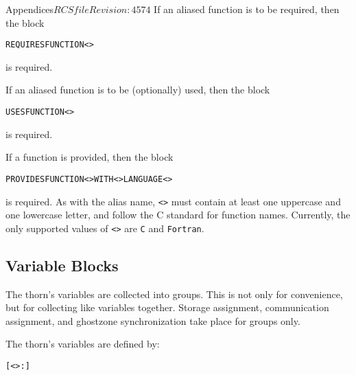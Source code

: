 \begin{cactuspart}{Appendices}{$RCSfile$}{$Revision: 4574 $}
If an aliased function is to be required, then the block
\begin{alltt}
REQUIRES FUNCTION <>
\end{alltt}
is required.

If an aliased function is to be (optionally) used, then the block
\begin{alltt}
USES FUNCTION <>
\end{alltt}
is required.

If a function is provided, then the block
\begin{alltt}
PROVIDES FUNCTION <> WITH <> LANGUAGE <>
\end{alltt}
is required. As with the alias name, \texttt{<>} must contain at
least one uppercase and one lowercase letter, and follow the C standard
for function names. Currently, the only supported values of
\texttt{<>} are \verb|C| and \verb|Fortran|.


\subsection{Variable Blocks}
\label{subsec:Appendix.interface-variables}
The thorn's variables are collected into groups. This is not only
for convenience, but for collecting like variables together.
Storage assignment, communication assignment, and ghostzone synchronization
take place for groups only.

The thorn's variables are defined by:

\begin{alltt}
[<>:]


\end{alltt}
\end{cactuspart}
